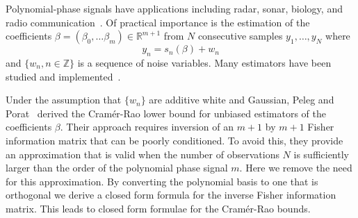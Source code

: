 \documentclass[review]{elsarticle}
\newcommand{\reals}{{\mathbb R}}
\newcommand{\ints}{{\mathbb Z}}
\begin{document}
Polynomial-phase signals have applications including radar, sonar, biology, and radio communication~\cite{Angeby_estimating_2000}.  %
Of practical importance is the estimation of the coefficients $\beta = (\beta_0, \dots \beta_m)\in\reals^{m+1}$ from $N$ consecutive samples $y_1, \dots, y_N$ where 
\begin{equation}\label{eq:yndatamodel}
y_n = s_n(\beta) + w_n
\end{equation}
and $\{w_n, n \in \ints\}$ is a sequence of noise variables.  Many estimators have been studied and implemented~\cite{Angeby_estimating_2000,Oshea_cpf_2004,Morelande_bayes_unwrapping_2009_tsp,Peleg_DPT_1995, Djuric_phase_unwrap_chirp_1990}.  


Under the assumption that $\{w_n\}$ are additive white and Gaussian, Peleg and Porat~\cite{Peleg1991_CRB_PPS_1991} derived the Cram\'{e}r-Rao lower bound for unbiased estimators of the coefficients $\beta$.  Their approach requires inversion of an $m+1$ by $m+1$ Fisher information matrix that can be poorly conditioned.  To avoid this, they provide an approximation that is valid when the number of observations $N$ is sufficiently larger than the order of the polynomial phase signal $m$.  Here we remove the need for this approximation.  By converting the polynomial basis to one that is orthogonal we derive a closed form formula for the inverse Fisher information matrix.  This leads to closed form formulae for the Cram\'{e}r-Rao bounds.  %
\end{document}
